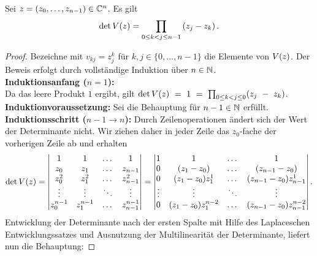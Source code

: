 \begin{lemma}
    Sei $z = (z_0, \dots, z_{n-1}) \in \mathbb{C}^n$.
    Es gilt
    \[
        \det V \! \left( z \right)
        = \prod_{0 \leq k < j \leq n-1} \left( z_j - z_k \right).
    \]
\end{lemma}

\begin{proof}
    Bezeichne mit $v_{kj} = z_j^k$ für $k,j \in \{0, \dots, n-1\}$ die Elemente von $V \! \left( z \right)$.
    Der Beweis erfolgt durch vollständige Induktion über $n \in \mathbb{N}$.\\
    \textbf{Induktionsanfang (\boldmath $n=1$):}\\
    Da das leere Produkt $1$ ergibt, gilt
    $\det{V \! \left( z \right)}~=~1~=~\prod_{0 \leq k < j \leq 0} (z_j~-~z_k)$. \\[0.5em]
    \textbf{Induktionvoraussetzung:}
    Sei die Behauptung für $n-1 \in \mathbb{N}$ erfüllt.\\[0.5em]
    \textbf{Induktionsschritt (\boldmath $n\!-\!1 \rightarrow n$):}
    Durch Zeilenoperationen ändert sich der Wert der Determinante nicht.
    Wir ziehen daher in jeder Zeile das $z_0$-fache der vorherigen Zeile ab und
    erhalten
    \[
        \det{V \! \left( z \right)}
        = \begin{vmatrix}
            1         & 1         & \dots & 1 \\
            z_0       & z_1       & \dots & z_{n-1} \\
            z_0^2     & z_1^2     & \dots & z_{n-1}^2 \\
            \vdots    & \vdots    & \ddots & \vdots \\
            z_0^{n-1} & z_1^{n-1} & \dots & z_{n-1}^{n-1}
        \end{vmatrix}
        = \begin{vmatrix}
            1      & 1                  & \dots & 1 \\
            0      & (z_1-z_0)          & \dots & (z_{n-1}-z_0) \\
            0      & (z_1-z_0)z_1^1     & \dots & (z_{n-1}-z_0) z_{n-1}^1 \\
            \vdots & \vdots             & \ddots & \vdots \\
            0      & (z_1-z_0)z_1^{n-2} & \dots & (z_{n-1}-z_0) z_{n-1}^{n-2}
        \end{vmatrix}.
    \]
    Entwicklung der Determinante nach der ersten Spalte mit Hilfe des
    Laplaceschen Entwicklungssatzes und Ausnutzung der Multilinearität der
    Determinante, liefert nun die Behauptung:

\end{proof}
